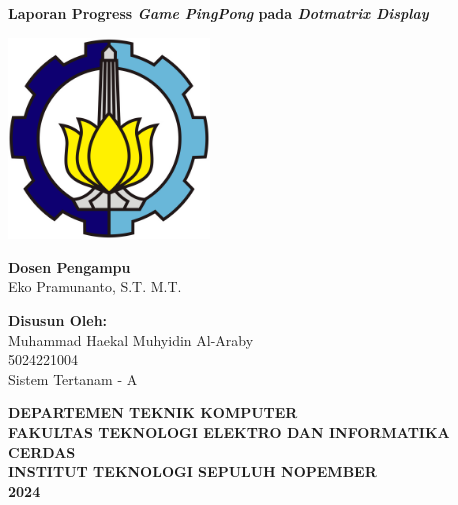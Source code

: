 \documentclass[a4paper,12pt]{article}
\begin{document}
\begin{titlepage}
    \centering
    \vspace*{1cm}
    {\Large \textbf{Laporan Progress \textit{Game PingPong} pada \textit{Dotmatrix Display}}}
    \vfill
    \vspace{2cm}

    \includegraphics[width=0.4\textwidth]{./images/logo.png}
    \vfill

    \vspace{1cm}
    \begin{onehalfspace}
    \textbf{Dosen Pengampu}\\
    Eko Pramunanto, S.T. M.T.

    \vspace{1cm}

    \textbf{Disusun Oleh:}\\
    Muhammad Haekal Muhyidin Al-Araby\\
    5024221004\\
    Sistem Tertanam - A
    \end{onehalfspace}

    \vfill

    \textbf{DEPARTEMEN TEKNIK KOMPUTER\\
    FAKULTAS TEKNOLOGI ELEKTRO DAN INFORMATIKA CERDAS\\
    INSTITUT TEKNOLOGI SEPULUH NOPEMBER\\2024}
\end{titlepage}
\end{document}
